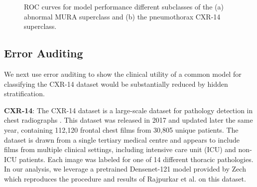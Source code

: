 \documentclass{article}
\begin{document}
 \begin{figure}[htb!]%
\centering
{}%
\caption{ROC curves for model performance different subclasses of the (a) abnormal MURA superclass and (b) the pneumothorax CXR-14 superclass.}
\label{fig:rocs}
\end{figure}


\subsection{Error Auditing}

We next use error auditing to show the clinical utility of a common model for classifying the CXR-14 dataset would be substantially reduced by hidden stratification.

\textbf{CXR-14}: The CXR-14 dataset is a large-scale dataset for pathology detection in chest radiographs \citep{Wang2017-vm}. 
This dataset was released in 2017 and updated later the same year, containing 112,120 frontal chest films from 30,805 unique patients. 
The dataset is drawn from a single tertiary medical centre and appears to include films from multiple clinical settings, including intensive care unit (ICU) and non-ICU patients.  
Each image was labeled for one of 14 different thoracic pathologies.  
In our analysis, we leverage a pretrained Densenet-121 model provided by Zech \citep{Zech_undated-cw} which reproduces the procedure and results of Rajpurkar et al. \citep{Rajpurkar2018-gc} on this dataset.  
\end{document}
